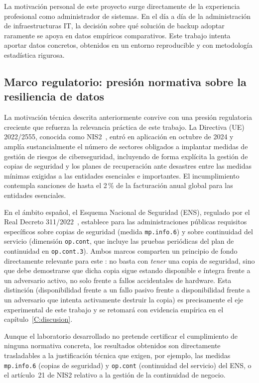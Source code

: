 \documentclass[../main.tex]{subfiles}
\begin{document}
La motivación personal de este proyecto surge directamente de la experiencia
profesional como administrador de sistemas. En el día a día de la
administración de infraestructuras IT, la decisión sobre qué solución de
backup adoptar raramente se apoya en datos empíricos comparativos. Este
trabajo intenta aportar datos concretos, obtenidos en un entorno
reproducible y con metodología estadística rigurosa.

\subsection{Marco regulatorio: presión normativa sobre la resiliencia
de datos}

La motivación técnica descrita anteriormente convive con una presión
regulatoria creciente que refuerza la relevancia práctica de este trabajo.
La Directiva (UE) 2022/2555, conocida como NIS2~\cite{nis2}, entró en
aplicación en octubre de 2024 y amplía sustancialmente el número de sectores obligados a
implantar medidas de gestión de riesgos de ciberseguridad, incluyendo de
forma explícita la gestión de copias de seguridad y los planes de
recuperación ante desastres entre las medidas mínimas exigidas a las
entidades esenciales e importantes. El incumplimiento contempla sanciones
de hasta el 2\,\% de la facturación anual global para las entidades
esenciales.

En el ámbito español, el Esquema Nacional de Seguridad (ENS), regulado por
el Real Decreto 311/2022~\cite{ens2022}, establece para las administraciones
públicas
requisitos específicos sobre copias de seguridad (medida \texttt{mp.info.6})
y sobre continuidad del servicio (dimensión \texttt{op.cont}, que incluye
las pruebas periódicas del plan de continuidad en \texttt{op.cont.3}). Ambos marcos comparten un principio de fondo
directamente relevante para este \pfg: no basta con \emph{tener} una copia
de seguridad, sino que debe demostrarse que dicha copia sigue estando
disponible e íntegra frente a un adversario activo, no solo frente a fallos
accidentales de hardware. Esta distinción (disponibilidad frente a un
fallo pasivo frente a disponibilidad frente a un adversario que
intenta activamente destruir la copia) es precisamente el eje
experimental de este trabajo y se retomará con evidencia empírica en el
capítulo~\ref{C:discusion}.

Aunque el laboratorio desarrollado no pretende certificar el cumplimiento
de ninguna normativa concreta, los resultados obtenidos son directamente
trasladables a la justificación técnica que exigen, por ejemplo, las medidas
\texttt{mp.info.6} (copias de seguridad) y \texttt{op.cont} (continuidad del
servicio) del ENS, o el artículo~21 de NIS2 relativo a la gestión de la
continuidad de negocio.
\end{document}
